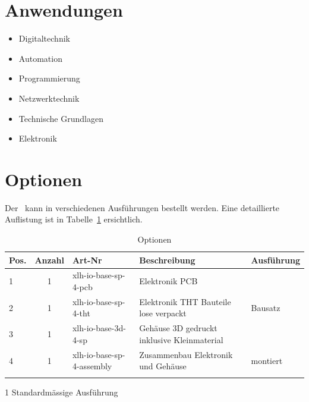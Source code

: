 \documentclass[10pt]{datasheet}
\begin{document}
\section{Anwendungen}

\begin{itemize}
    \item Digitaltechnik
    \item Automation
    \item Programmierung
    \item Netzwerktechnik
    \item Technische Grundlagen
    \item Elektronik
\end{itemize}

\vfill\break


\onecolumn

\section{Optionen}
Der \xlhPlattformID\ kann in verschiedenen Ausführungen bestellt werden.
Eine detaillierte Auflistung ist in Tabelle~\ref{tab:optionen} ersichtlich.

\begin{table}[h]
\begin{threeparttable}
\caption{Optionen \xlhPlattformID}
    \begin{tabularx}{\textwidth}{l | c | l | l | X}

        \thickhline
        \textbf{Pos.} & \textbf{Anzahl} & \textbf{Art-Nr} & \textbf{Beschreibung} & \textbf{Ausführung} \\
        \hline
        1 & 1 & xlh-io-base-sp-4-pcb & Elektronik PCB & \multirow{3}{*}{Bausatz\tnote{1}}  \\
        2 & 1 & xlh-io-base-sp-4-tht & Elektronik THT Bauteile lose verpackt &  \\
        3 & 1 & xlh-io-base-3d-4-sp & Gehäuse 3D gedruckt inklusive Kleinmaterial & \\
        \hline
        4 & 1 & xlh-io-base-sp-4-assembly & Zusammenbau Elektronik und Gehäuse & montiert \\
        \thickhline
    \end{tabularx}
\begin{tablenotes}
\item[1]{Standardmässige Ausführung}
\end{tablenotes}
\label{tab:optionen}
\end{threeparttable}
\end{table}
\end{document}
